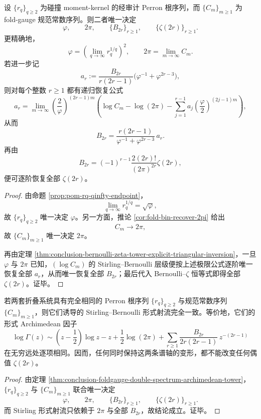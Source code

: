 \begin{theorem}\label{thm:conclusion-foldgauge-double-spectrum-archimedean-tower}
设 \(\{r_q\}_{q\ge 2}\) 为碰撞 moment-kernel 的经审计 Perron 根序列，而 \(\{C_m\}_{m\ge 1}\) 为 fold-gauge 规范常数序列。则二者唯一决定
\[
\varphi,\qquad
2\pi,\qquad
\{B_{2r}\}_{r\ge 1},\qquad
\{\zeta(2r)\}_{r\ge 1}.
\]
更精确地，
\[
\varphi=\left(\lim_{q\to\infty}r_q^{1/q}\right)^2,
\qquad
2\pi=\lim_{m\to\infty}C_m.
\]
若进一步记
\[
a_r:=
\frac{B_{2r}}{r(2r-1)}
\bigl(\varphi^{-1}+\varphi^{2r-3}\bigr),
\]
则对每个整数 \(r\ge 1\) 都有递归恢复公式
\[
a_r=
\lim_{m\to\infty}
\left(\frac{2}{\varphi}\right)^{(2r-1)m}
\left(
\log C_m-\log(2\pi)-\sum_{j=1}^{r-1}a_j\left(\frac{\varphi}{2}\right)^{(2j-1)m}
\right),
\]
从而
\[
B_{2r}
=
\frac{r(2r-1)}{\varphi^{-1}+\varphi^{2r-3}}\,a_r.
\]
再由
\[
B_{2r}=(-1)^{r-1}\frac{2(2r)!}{(2\pi)^{2r}}\zeta(2r),
\]
便可逐阶恢复全部 \(\zeta(2r)\)。
\end{theorem}
\begin{proof}
由命题 \ref{prop:pom-rq-qinfty-endpoint}，
\[
\lim_{q\to\infty}r_q^{1/q}=\sqrt{\varphi},
\]
故 \(\{r_q\}_{q\ge 2}\) 唯一决定 \(\varphi\)。另一方面，推论 \ref{cor:fold-bin-recover-2pi} 给出
\[
C_m\to 2\pi,
\]
故 \(\{C_m\}_{m\ge 1}\) 唯一决定 \(2\pi\)。

再由定理 \ref{thm:conclusion-bernoulli-zeta-tower-explicit-triangular-inversion}，一旦 \(\varphi\) 与 \(2\pi\) 已知，\((\log C_m)\) 的 Stirling--Bernoulli 层级便按上述极限公式逐阶唯一恢复全部 \(a_r\)，从而唯一恢复全部 \(B_{2r}\)；最后代入 Bernoulli--\(\zeta\) 恒等式即得全部 \(\zeta(2r)\)。证毕。
\end{proof}

\begin{corollary}[两尺度谱刚性]\label{cor:conclusion-foldgauge-two-scale-spectral-rigidity}
若两套折叠系统具有完全相同的 Perron 根序列 \(\{r_q\}_{q\ge 2}\) 与规范常数序列 \(\{C_m\}_{m\ge 1}\)，则它们诱导的 Stirling--Bernoulli 形式射流完全一致。等价地，它们的形式 Archimedean 因子
\[
\log \Gamma(z)\sim
\left(z-\frac12\right)\log z-z+\frac12\log(2\pi)
+\sum_{r\ge 1}\frac{B_{2r}}{2r(2r-1)}\,z^{-(2r-1)}
\]
在无穷远处逐项相同。因而，任何同时保持这两条谱轴的变形，都不能改变任何偶值 \(\zeta(2r)\)。
\end{corollary}
\begin{proof}
由定理 \ref{thm:conclusion-foldgauge-double-spectrum-archimedean-tower}，\(\{r_q\}_{q\ge 2}\) 与 \(\{C_m\}_{m\ge 1}\) 联合唯一决定
\[
\varphi,\qquad
2\pi,\qquad
\{B_{2r}\}_{r\ge 1},\qquad
\{\zeta(2r)\}_{r\ge 1}.
\]
而 Stirling 形式射流只依赖于 \(2\pi\) 与全部 \(B_{2r}\)，故结论成立。证毕。
\end{proof}
